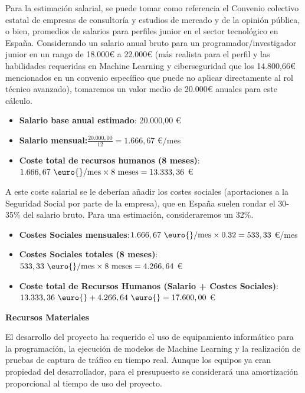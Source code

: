 Para la estimación salarial, se puede tomar como referencia el Convenio colectivo estatal de empresas de consultoría y estudios de mercado y de la opinión pública, o bien, promedios de salarios para perfiles junior en el sector tecnológico en España. Considerando un salario anual bruto para un programador/investigador junior en un rango de 18.000€ a 22.000€ (más realista para el perfil y las habilidades requeridas en Machine Learning y ciberseguridad que los 14.800,66€ mencionados en un convenio específico que puede no aplicar directamente al rol técnico avanzado), tomaremos un valor medio de 20.000€ anuales para este cálculo.
\begin{itemize}

    \item\textbf{Salario base anual estimado}: 20.000,00 \euro{}
    
    \item \textbf{Salario mensual:}$\displaystyle \frac{20.000,00}{12} = 1.666,67 $ \euro{}/mes
   
    \item\textbf{Coste total de recursos humanos (8 meses)}:$\displaystyle 1.666,67 \text{ \euro{}/mes} \times 8 \text{ meses} = 13.333,36 $ \euro{}

\end{itemize}

A este coste salarial se le deberían añadir los costes sociales (aportaciones a la Seguridad Social por parte de la empresa), que en España suelen rondar el 30-35\% del salario bruto. Para una estimación, consideraremos un 32\%.
\begin{itemize}
    
    \item\textbf{Costes Sociales mensuales}:$\displaystyle 1.666,67 \text{ \euro{}/mes} \times 0.32 = 533,33 $ \euro{}/mes
    
    \item\textbf{Costes Sociales totales (8 meses)}:$\displaystyle 533,33 \text{ \euro{}/mes} \times 8 \text{ meses} = 4.266,64 $ \euro{}
    
    \item\textbf{Coste total de Recursos Humanos (Salario + Costes Sociales)}:$\displaystyle 13.333,36 \text{ \euro{}} + 4.266,64 \text{ \euro{}} = 17.600,00 $ \euro{}
    
\end{itemize}

\textbf{Recursos Materiales}
 
El desarrollo del proyecto ha requerido el uso de equipamiento informático para la programación, la ejecución de modelos de Machine Learning y la realización de pruebas de captura de tráfico en tiempo real. Aunque los equipos ya eran propiedad del desarrollador, para el presupuesto se considerará una amortización proporcional al tiempo de uso del proyecto.

